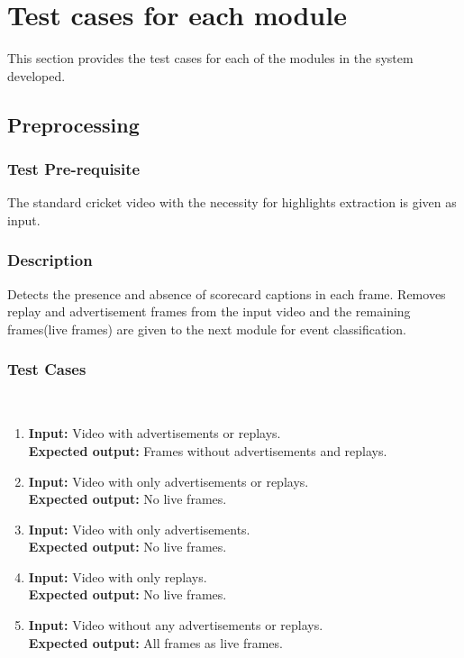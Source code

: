 \chapter{Test cases for each module}
This section provides the test cases for each of the modules in the system developed.
\section{Preprocessing}
\subsection{Test Pre-requisite}
The standard cricket video with the necessity for highlights extraction is given as input.
\subsection{Description}
Detects the presence and absence of scorecard captions in each frame. Removes replay and advertisement frames from the input video and the remaining frames(live frames) are given to the next module for event classification. 
\subsection{Test Cases}\\
\begin{enumerate}
\item \textbf{Input:} Video with advertisements or replays.\\
\indent \textbf{Expected output:} Frames without advertisements and replays.\\

\item \textbf{Input:} Video with only advertisements or replays.\\
\indent \textbf{Expected output:} No live frames.\\

\item \textbf{Input:} Video with only advertisements.\\
\indent \textbf{Expected output:} No live frames.\\

\item \textbf{Input:} Video with only replays.\\
\indent \textbf{Expected output:} No live frames.\\

\item \textbf{Input:} Video without any advertisements or replays.\\
 \indent \textbf{Expected output:} All frames as live frames.\\
\end{enumerate}


